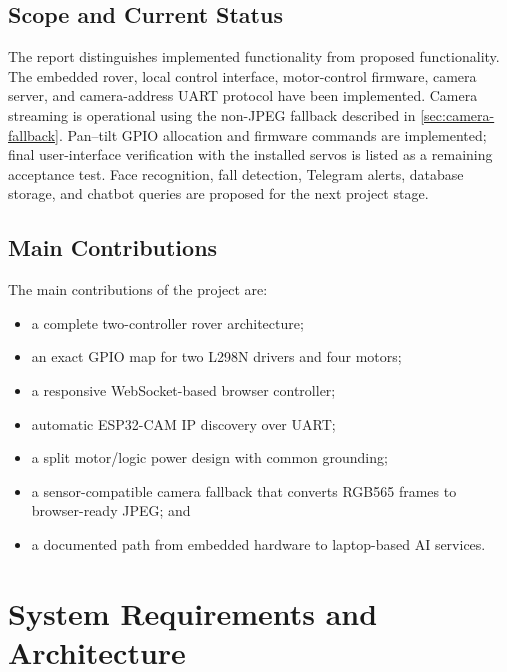 \documentclass[12pt,a4paper,oneside]{report}
\begin{document}
\section{Scope and Current Status}
The report distinguishes implemented functionality from proposed functionality.
The embedded rover, local control interface, motor-control firmware, camera
server, and camera-address UART protocol have been implemented. Camera streaming
is operational using the non-JPEG fallback described in
\cref{sec:camera-fallback}. Pan--tilt GPIO allocation and firmware commands are
implemented; final user-interface verification with the installed servos is
listed as a remaining acceptance test. Face recognition, fall detection,
Telegram alerts, database storage, and chatbot queries are proposed for the
next project stage.

\section{Main Contributions}
The main contributions of the project are:

\begin{itemize}
  \item a complete two-controller rover architecture;
  \item an exact GPIO map for two L298N drivers and four motors;
  \item a responsive WebSocket-based browser controller;
  \item automatic ESP32-CAM IP discovery over UART;
  \item a split motor/logic power design with common grounding;
  \item a sensor-compatible camera fallback that converts RGB565 frames to
        browser-ready JPEG; and
  \item a documented path from embedded hardware to laptop-based AI services.
\end{itemize}

\chapter{System Requirements and Architecture}
\label{ch:architecture}
\end{document}
